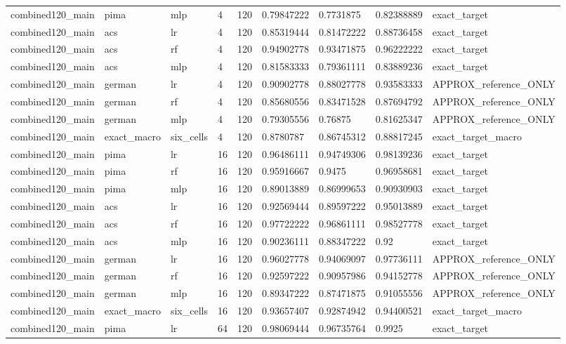 \begin{tabular}{lllllllll}
combined120\_main & pima & mlp & 4 & 120 & 0.79847222 & 0.7731875 & 0.82388889 & exact\_target \\
combined120\_main & acs & lr & 4 & 120 & 0.85319444 & 0.81472222 & 0.88736458 & exact\_target \\
combined120\_main & acs & rf & 4 & 120 & 0.94902778 & 0.93471875 & 0.96222222 & exact\_target \\
combined120\_main & acs & mlp & 4 & 120 & 0.81583333 & 0.79361111 & 0.83889236 & exact\_target \\
combined120\_main & german & lr & 4 & 120 & 0.90902778 & 0.88027778 & 0.93583333 & APPROX\_reference\_ONLY \\
combined120\_main & german & rf & 4 & 120 & 0.85680556 & 0.83471528 & 0.87694792 & APPROX\_reference\_ONLY \\
combined120\_main & german & mlp & 4 & 120 & 0.79305556 & 0.76875 & 0.81625347 & APPROX\_reference\_ONLY \\
combined120\_main & exact\_macro & six\_cells & 4 & 120 & 0.8780787 & 0.86745312 & 0.88817245 & exact\_target\_macro \\
combined120\_main & pima & lr & 16 & 120 & 0.96486111 & 0.94749306 & 0.98139236 & exact\_target \\
combined120\_main & pima & rf & 16 & 120 & 0.95916667 & 0.9475 & 0.96958681 & exact\_target \\
combined120\_main & pima & mlp & 16 & 120 & 0.89013889 & 0.86999653 & 0.90930903 & exact\_target \\
combined120\_main & acs & lr & 16 & 120 & 0.92569444 & 0.89597222 & 0.95013889 & exact\_target \\
combined120\_main & acs & rf & 16 & 120 & 0.97722222 & 0.96861111 & 0.98527778 & exact\_target \\
combined120\_main & acs & mlp & 16 & 120 & 0.90236111 & 0.88347222 & 0.92 & exact\_target \\
combined120\_main & german & lr & 16 & 120 & 0.96027778 & 0.94069097 & 0.97736111 & APPROX\_reference\_ONLY \\
combined120\_main & german & rf & 16 & 120 & 0.92597222 & 0.90957986 & 0.94152778 & APPROX\_reference\_ONLY \\
combined120\_main & german & mlp & 16 & 120 & 0.89347222 & 0.87471875 & 0.91055556 & APPROX\_reference\_ONLY \\
combined120\_main & exact\_macro & six\_cells & 16 & 120 & 0.93657407 & 0.92874942 & 0.94400521 & exact\_target\_macro \\
combined120\_main & pima & lr & 64 & 120 & 0.98069444 & 0.96735764 & 0.9925 & exact\_target \\

\end{tabular}
